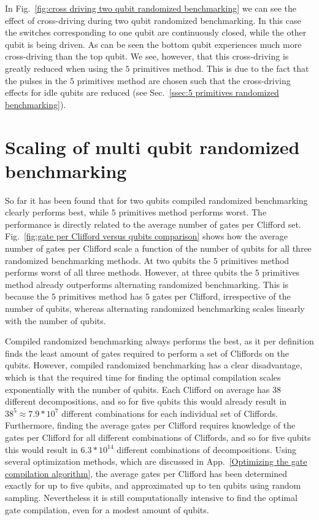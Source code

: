           In Fig.~\ref{fig:cross driving two qubit randomized benchmarking} we can see the effect of cross-driving during two qubit randomized benchmarking. In this case the switches corresponding to one qubit are continuously closed, while the other qubit is being driven. As can be seen the bottom qubit experiences much more cross-driving than the top qubit. We see, however, that this cross-driving is greatly reduced when using the $5$ primitives method. This is due to the fact that the pulses in the $5$ primitives method are chosen such that the cross-driving effects for idle qubits are reduced (see Sec.~\ref{ssec:5 primitives randomized benchmarking}).

        \section{Scaling of multi qubit randomized benchmarking}
          \label{sec:scaling of multi qubit randomized benchmarking}


          So far it has been found that for two qubits compiled randomized benchmarking clearly performs best, while $5$ primitives method performs worst. The performance is directly related to the average number of gates per Clifford set. Fig.~\ref{fig:gate per Clifford versus qubits comparison} shows how the average number of gates per Clifford scale a function of the number of qubits for all three randomized benchmarking methods. At two qubits the $5$ primitives method performs worst of all three methods. However, at three qubits the $5$ primitives method already outperforms alternating randomized benchmarking. This is because the $5$ primitives method has $5$ gates per Clifford, irrespective of the number of qubits, whereas alternating randomized benchmarking scales linearly with the number of qubits.

          Compiled randomized benchmarking always performs the best, as it per definition finds the least amount of gates required to perform a set of Cliffords on the qubits. However, compiled randomized benchmarking has a clear disadvantage, which is that the required time for finding the optimal compilation scales exponentially with the number of qubits. Each Clifford on average has $38$ different decompositions, and so for five qubits this would already result in $38^5\approx 7.9 * 10^{7}$ different combinations for each individual set of Cliffords. Furthermore, finding the average gates per Clifford requires knowledge of the gates per Clifford for all different combinations of Cliffords, and so for five qubits this would result in $6.3*10^{14}$ different combinations of decompositions. Using several optimization methods, which are discussed in App.~\ref{Optimizing the gate compilation algorithm}, the average gates per Clifford has been determined exactly for up to five qubits, and approximated up to ten qubits using random sampling. Nevertheless it is still computationally intensive to find the optimal gate compilation, even for a modest amount of qubits.

